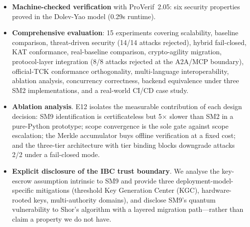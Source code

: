 \documentclass[10pt,twocolumn]{IEEEtran}
\begin{document}
\begin{itemize}
    problem (ECDLP) for SM2, module learning with errors (MLWE) for
    ML-DSA), with concrete advantage bounds.
  \item \textbf{Machine-checked verification} with ProVerif~2.05: six
    security properties proved in the Dolev-Yao model (0.29s runtime).
  \item \textbf{Comprehensive evaluation}: 15 experiments covering
    scalability, baseline comparison, threat-driven security (14/14
    attacks rejected), hybrid fail-closed, KAT conformance, real-baseline
    comparison, crypto-agility migration, protocol-layer integration
    (8/8 attacks rejected at the A2A/MCP boundary), official-TCK
    conformance orthogonality, multi-language interoperability,
    ablation analysis, concurrency correctness, backend equivalence
    under three SM2 implementations, and a real-world CI/CD
    case study.
  \item \textbf{Ablation analysis}. E12 isolates the measurable
    contribution of each design decision: SM9 identification is
    certificateless but 5$\times$ slower than SM2 in a pure-Python
    prototype; scope convergence is the sole gate against scope
    escalation; the Merkle accumulator buys offline verification at a
    fixed cost; and the three-tier architecture with tier binding
    blocks downgrade attacks 2/2 under a fail-closed mode.
  \item \textbf{Explicit disclosure of the IBC trust boundary}. We
    analyse the key-escrow     assumption intrinsic to SM9 and provide
    three deployment-model-specific mitigations (threshold Key Generation
    Center (KGC), hardware-rooted keys, multi-authority domains), and
    disclose SM9's
    quantum vulnerability to Shor's algorithm with a layered migration
    path---rather than claim a property we do not have.
\end{itemize}
\end{document}
